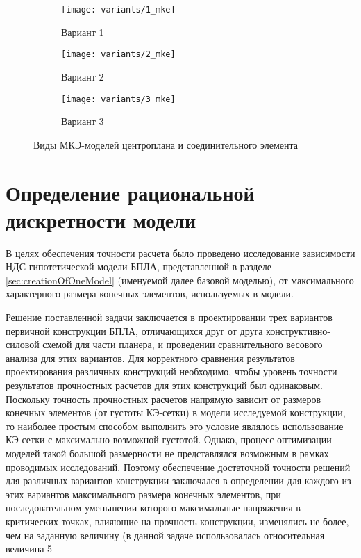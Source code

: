 \begin{figure}[H]
\centering
\begin{subfigure}[b]{0.32\textwidth}
	\texttt{[image: variants/1\_mke]}		\caption{Вариант 1}
	\label{fig:variants_mke:1}
\end{subfigure}
\hspace{\fill}
\begin{subfigure}[b]{0.32\textwidth}
	\texttt{[image: variants/2\_mke]}
		\caption{Вариант 2}
		\label{fig:variants_mke:2}
\end{subfigure}
\hspace{\fill}
\begin{subfigure}[b]{0.32\textwidth}
	\texttt{[image: variants/3\_mke]}
		\caption{Вариант 3}
		\label{fig:variants_mke:3}
\end{subfigure}
\hspace{\fill}
\caption{Виды МКЭ-моделей центроплана и соединительного элемента}
\label{fig:variants_mke}
\end{figure}	



\section{Определение рациональной дискретности модели}
\label{sec:optimalMKESize}

В целях обеспечения точности расчета было проведено исследование зависимости 
НДС гипотетической модели БПЛА, представленной в разделе \ref{sec:creationOfOneModel} (именуемой далее базовой моделью), от максимального характерного размера конечных элементов, используемых в модели. 

Решение поставленной задачи заключается в проектировании трех вариантов первичной конструкции БПЛА, отличающихся друг от друга конструктивно-силовой схемой для части планера, и проведении сравнительного весового анализа для этих вариантов. Для корректного сравнения результатов проектирования различных конструкций необходимо, чтобы уровень точности результатов прочностных расчетов для этих конструкций был одинаковым. Поскольку точность прочностных расчетов напрямую зависит от размеров конечных элементов (от густоты КЭ-сетки) в модели исследуемой конструкции, то наиболее простым способом выполнить это условие являлось использование КЭ-сетки с максимально возможной густотой. Однако, процесс оптимизации моделей такой большой размерности не представлялся возможным в рамках проводимых исследований. Поэтому обеспечение достаточной точности решений для различных вариантов конструкции заключался в определении для каждого из этих вариантов максимального размера конечных элементов, при последовательном уменьшении которого максимальные напряжения в критических точках, влияющие на прочность конструкции, изменялись не более, чем на заданную величину (в данной задаче использовалась относительная величина 5%


